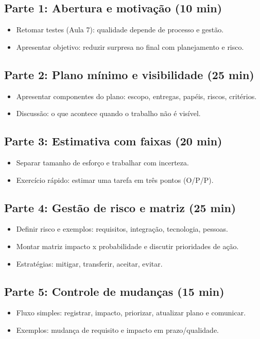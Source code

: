 \documentclass[12pt,a4paper]{article}
\begin{document}
\subsection*{Parte 1: Abertura e motivação (10 min)}
\begin{itemize}[leftmargin=*,itemsep=0.35em]
  \item Retomar testes (Aula 7): qualidade depende de processo e gestão.
  \item Apresentar objetivo: reduzir surpresa no final com planejamento e risco.
\end{itemize}

\subsection*{Parte 2: Plano mínimo e visibilidade (25 min)}
\begin{itemize}[leftmargin=*,itemsep=0.35em]
  \item Apresentar componentes do plano: escopo, entregas, papéis, riscos, critérios.
  \item Discussão: o que acontece quando o trabalho não é visível.
\end{itemize}

\subsection*{Parte 3: Estimativa com faixas (20 min)}
\begin{itemize}[leftmargin=*,itemsep=0.35em]
  \item Separar tamanho de esforço e trabalhar com incerteza.
  \item Exercício rápido: estimar uma tarefa em três pontos (O/P/P).
\end{itemize}

\subsection*{Parte 4: Gestão de risco e matriz (25 min)}
\begin{itemize}[leftmargin=*,itemsep=0.35em]
  \item Definir risco e exemplos: requisitos, integração, tecnologia, pessoas.
  \item Montar matriz impacto x probabilidade e discutir prioridades de ação.
  \item Estratégias: mitigar, transferir, aceitar, evitar.
\end{itemize}

\subsection*{Parte 5: Controle de mudanças (15 min)}
\begin{itemize}[leftmargin=*,itemsep=0.35em]
  \item Fluxo simples: registrar, impacto, priorizar, atualizar plano e comunicar.
  \item Exemplos: mudança de requisito e impacto em prazo/qualidade.
\end{itemize}
\end{document}
